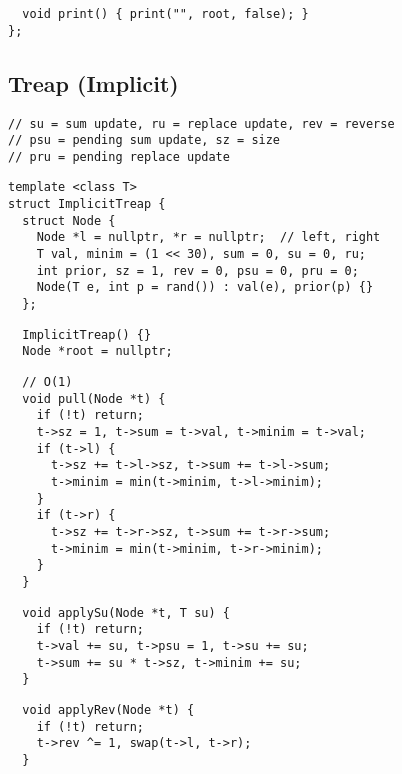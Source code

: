 \documentclass[twoside]{article}
\newcommand{\fileTitleStyle}{\large\underline}
\begin{document}
\begin{multicols*}{2}
\begin{verbatim}
  void print() { print("", root, false); }
};
\end{verbatim}

\subsectionfont{\centering\bfseries\LARGE}
\subsectionfont{\fileTitleStyle}
\subsection*{Treap (Implicit)}
\begin{verbatim}
// su = sum update, ru = replace update, rev = reverse
// psu = pending sum update, sz = size
// pru = pending replace update
\end{verbatim}
\vspace{-12pt}
\begin{verbatim}
template <class T>
struct ImplicitTreap {
  struct Node {
    Node *l = nullptr, *r = nullptr;  // left, right
    T val, minim = (1 << 30), sum = 0, su = 0, ru;
    int prior, sz = 1, rev = 0, psu = 0, pru = 0;
    Node(T e, int p = rand()) : val(e), prior(p) {}
  };
\end{verbatim}
\vspace{-12pt}
\begin{verbatim}
  ImplicitTreap() {}
  Node *root = nullptr;
\end{verbatim}
\vspace{-12pt}
\begin{verbatim}
  // O(1)
  void pull(Node *t) {
    if (!t) return;
    t->sz = 1, t->sum = t->val, t->minim = t->val;
    if (t->l) {
      t->sz += t->l->sz, t->sum += t->l->sum;
      t->minim = min(t->minim, t->l->minim);
    }
    if (t->r) {
      t->sz += t->r->sz, t->sum += t->r->sum;
      t->minim = min(t->minim, t->r->minim);
    }
  }
\end{verbatim}
\vspace{-12pt}
\begin{verbatim}
  void applySu(Node *t, T su) {
    if (!t) return;
    t->val += su, t->psu = 1, t->su += su;
    t->sum += su * t->sz, t->minim += su;
  }
\end{verbatim}
\vspace{-12pt}
\begin{verbatim}
  void applyRev(Node *t) {
    if (!t) return;
    t->rev ^= 1, swap(t->l, t->r);
  }
\end{verbatim}
\vspace{-12pt}

\end{multicols*}
\end{document}
